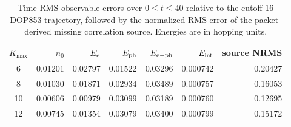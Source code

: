 \documentclass[10pt]{article}
\begin{document}
\begin{table}[htbp]
  \centering
  \small
  \begin{tabular}{c@{\qquad}rrrrrr}
    \toprule
    $K_{\max}$ & $n_0$ & $E_{\rm e}$ & $E_{\rm ph}$ & $E_{\rm e-ph}$ & $E_{\rm int}$ & source NRMS \\
    \midrule
     6 & 0.01201 & 0.02797 & 0.01522 & 0.03296 & 0.000742 & 0.20427 \\
     8 & 0.01030 & 0.01871 & 0.02934 & 0.03489 & 0.000757 & 0.16053 \\
    10 & 0.00606 & 0.00979 & 0.03099 & 0.03189 & 0.000760 & 0.12695 \\
    12 & 0.00745 & 0.01354 & 0.03079 & 0.03400 & 0.000799 & 0.15172 \\
    \bottomrule
  \end{tabular}
  \caption{Time-RMS observable errors over $0\le t\le40$ relative to the
  cutoff-16 DOP853 trajectory, followed by the normalized RMS error of the
  packet-derived missing correlation source.  Energies are in hopping units.}
\end{table}
\end{document}
